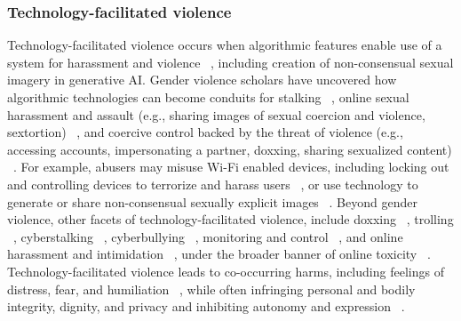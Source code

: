 \subsubsection{Technology-facilitated violence} Technology-facilitated violence occurs when algorithmic features enable use of a system for harassment and violence ~\cite{Afrouz2021, Bailey_Henry_Flynn_2021, Brown_Sanci_Hegarty_2021, Dragiewicz_2018, Henry_Flynn_Powell_2020}, including creation of non-consensual sexual imagery in generative AI. Gender violence scholars have uncovered how algorithmic technologies can become conduits for stalking ~\cite{Freed_Palmer_Minchala_Levy_Ristenpart_Dell_2018, Henry_Flynn_Powell_2020}, online sexual harassment and assault (e.g., sharing images of sexual coercion and violence, sextortion) ~\cite{Brown_Sanci_Hegarty_2021}, and coercive control backed by the threat of violence (e.g., accessing accounts, impersonating a partner, doxxing, sharing sexualized content) ~\cite{Dragiewicz_2018}. For example, abusers may misuse Wi-Fi enabled devices, including locking out and controlling devices to terrorize and harass users ~\cite{Brown_Sanci_Hegarty_2021, PenzeyMoog_Slakoff_2021}, or use technology to generate or share non-consensual sexually explicit images ~\cite{Bailey_Burkell_Dunn_Gosse_Steeves_2021, McGlynn_Rackley_2017}. Beyond gender violence, other facets of technology-facilitated violence, include doxxing ~\cite{Douglas_2016}, trolling ~\cite{Ayodeji_Olamijuwon_Kokomma_Onyemelukwe_Gboyega_2021}, cyberstalking ~\cite{Ayodeji_Olamijuwon_Kokomma_Onyemelukwe_Gboyega_2021}, cyberbullying ~\cite{Ayodeji_Olamijuwon_Kokomma_Onyemelukwe_Gboyega_2021, Guberman_Schmitz_Hemphill_2016, Slonje_Smith_Frisen_2013}, monitoring and control ~\cite{Brown_Sanci_Hegarty_2021}, and online harassment and intimidation ~\cite{Guberman_Schmitz_Hemphill_2016, Scheuerman_Branham_Hamidi_2018, Sheth_Shalin_Kursuncu_2021, Vitak_Chadha_Steiner_Ashktorab_2017}, under the broader banner of online toxicity ~\cite{Guberman_Schmitz_Hemphill_2016, Maity_Chakraborty_Goyal_Mukherjee_2018}. Technology-facilitated violence leads to co-occurring harms, including feelings of distress, fear, and humiliation ~\cite{Brown_Sanci_Hegarty_2021}, while often infringing personal and bodily integrity, dignity, and privacy and inhibiting autonomy and expression ~\cite{McGlynn_Rackley_2017}.

